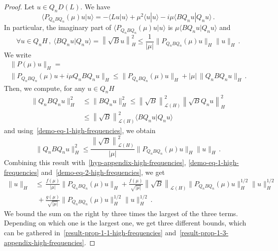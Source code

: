 \documentclass[AHL,Unicode,longabstracts]{cedram}
\newcommand{\Lc}{\mathcal{L}}
\let\oldforall\forall
\renewcommand*{\forall}{\mathrel{\oldforall}}
\begin{document}
\begin{proof}
Let $u\in Q_n D(L)$. We have
\[
\langle P_{Q_n B Q_n}(\mu) u | u \rangle = -\langle L u| u
\rangle + \mu^2 \langle u|u\rangle - i \mu \langle B Q_n u|Q_n u \rangle\,.
\]
In particular, the imaginary part of $\langle P_{Q_n B Q_n}(\mu)u|u\rangle$ is $\mu \langle B Q_n u|Q_n u\rangle$ and
\begin{equation}\label{demo-eq-1-high-frequencies}
\forall u\in Q_n H\,,\:\langle B Q_n u|Q_n u\rangle=\left\|\sqrt{B} u\right\|_H^2 \leq \frac 1{|\mu|} \|P_{Q_n B Q_n}(\mu) u\|_H \|u\|_H\,.
\end{equation}
We write
\begin{multline}\label{demo-eq-2-high-frequencies}
\|P(\mu)u\|_H=\\
\|P_{Q_n B Q_n}(\mu)u + i\mu Q_n B Q_n u\|_H \leq \|P_{Q_n B Q_n}(\mu)u\|_H+|\mu|\,\|Q_n B Q_n u\|_H\,.
\end{multline}
Then, we compute, for any $u\in Q_n H$
\begin{align*}
\|Q_n B Q_n u\|_H^2 &\leq \|B Q_n u\|_H^2 \leq \left\|\sqrt{B}\right\|^2_{\Lc(H)} \left\|\sqrt{B}Q_nu\right\|_H^2\\
& \leq \left\|\sqrt{B}\right\|^2_{\Lc(H)} \langle B Q_n u |Q_n u\rangle
\end{align*}
and using~\eqref{demo-eq-1-high-frequencies}, we obtain
\[
\|Q_n B Q_n u\|_H^2 \leq \frac {\left\|\sqrt{B}\right\|^2_{\Lc(H)}} {|\mu|}
\|P_{Q_n B Q_n}(\mu)u\|_H\|u\|_H\,.
\]
Combining this result with~\eqref{hyp-appendix-high-frequencies}, \eqref{demo-eq-1-high-frequencies} and~\eqref{demo-eq-2-high-frequencies}, we get
\begin{align*}
\|u\|_H &\leq\,\frac{f(\mu)}{|\mu|} \|P_{Q_n B Q_n}(\mu)u\|_H + \frac{f(\mu)}{\sqrt {|\mu|}} {\left\|\sqrt{B}\right\|_{\Lc(H)}}
\|P_{Q_n B Q_n}(\mu)u\|_H^{1/2}\|u\|_H^{1/2}\\
&\;+\frac{g(\mu)}{\sqrt {|\mu|}} \|P_{Q_n B Q_n}(\mu)u\|_H^{1/2}\|u\|_H^{1/2}\,.
\end{align*}
We bound the sum on the right by three times the largest of the three terms. Depending on which one is the largest one, we get three different bounds, which can be gathered in~\eqref{result-prop-1-1-high-frequencies} and~\eqref{result-prop-1-3-appendix-high-frequencies}.
\end{proof}




\end{document}
